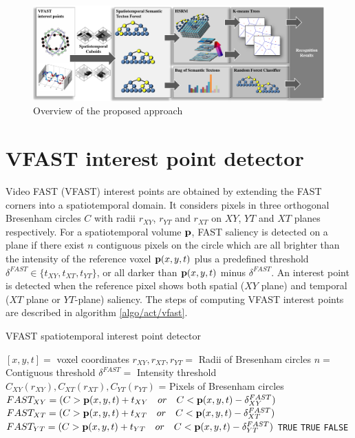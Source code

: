 \begin{figure}[ht]
	\centering  	
	\includegraphics[width=1.0\linewidth]{fig/act/fig1_new4.pdf}
	\caption{Overview of the proposed approach}
	\label{fig/act/flow}
\end{figure}

\section{VFAST interest point detector}
\label{sec/act/fastest}
Video FAST (VFAST) interest points are obtained by extending the FAST corners \cite{Rosten2006} into a spatiotemporal domain. It considers pixels in three orthogonal Bresenham circles $C$ with radii $r_{XY}$, $r_{YT}$ and $r_{XT}$ on $XY$, $YT$ and $XT$ planes respectively.
For a spatiotemporal volume $\mathbf{p}$, FAST saliency is detected on a plane if there exist $n$ contiguous pixels on the circle which are all brighter than the intensity of the reference voxel $\mathbf{p}(x,y,t)$ plus a predefined threshold $\delta^{FAST} \in \{ t_{XY}, t_{XT}, t_{YT} \}$, or all darker than $\mathbf{p}(x,y,t)$ minus $\delta^{FAST}$. An interest point is detected when the reference pixel shows both spatial ($XY$ plane) and temporal ($XT$ plane or $YT$-plane) saliency. The steps of computing VFAST interest points are described in algorithm \ref{algo/act/vfast}.

\begin{algorithm}
\caption{VFAST spatiotemporal interest point detector}
\label{algo/act/vfast}
\begin{algorithmic}
	\REQUIRE $[x,y,t] = $ voxel coordinates
	\REQUIRE $r_{XY},r_{XT},r_{YT} = $ Radii of Bresenham circles
	\REQUIRE $n = $ Contiguous threshold
	\REQUIRE $\delta^{FAST} = $ Intensity threshold
	\STATE $C_{XY}(r_{XY}),C_{XT}(r_{XT}),C_{YT}(r_{YT})$ = Pixels of Bresenham circles
	\STATE $FAST_{XY} = ( C > \mathbf{p}(x,y,t)+t_{XY}\quad or\quad C < \mathbf{p}(x,y,t)-\delta^{FAST}_{XY} )$
	\STATE $FAST_{XT} = ( C > \mathbf{p}(x,y,t)+t_{XT}\quad or\quad C < \mathbf{p}(x,y,t)-\delta^{FAST}_{XT} )$
	\STATE $FAST_{YT} = ( C > \mathbf{p}(x,y,t)+t_{YT}\quad or\quad C < \mathbf{p}(x,y,t)-\delta^{FAST}_{YT} )$
		\RETURN \texttt{TRUE}
		\RETURN \texttt{TRUE}
	\ELSE
		\RETURN \texttt{FALSE}
	\ENDIF
\ENDIF
\end{algorithmic}
\end{algorithm}


